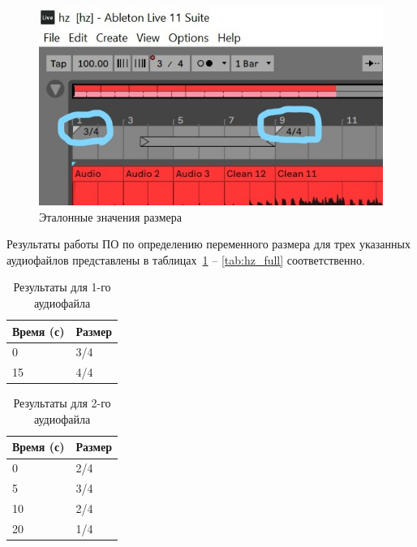 \begin{figure}[h]
	\centering
	\includegraphics[scale=0.7]{inc/img/hz_ref.jpg}
	\caption{Эталонные значения размера}
	\label{img:hz_ref}
\end{figure}


Результаты работы ПО по определению переменного размера для трех указанных аудиофайлов представлены в таблицах~\ref{tab:hz_drums} -- \ref{tab:hz_full} соответственно.

\begin{table}[!h]
	\begin{center}
		\caption{\label{tab:hz_drums}Результаты для 1-го аудиофайла}
		\begin{tabular}{|p{8cm}|p{8cm}|}
			\hline
			Время (с) & Размер\\
			\hline
			0 & 3/4\\
			\hline
			15 & 4/4\\
			\hline
		\end{tabular}
	\end{center}
\end{table}

\begin{table}[!h]
	\begin{center}
		\caption{\label{tab:hz_guitar}Результаты для 2-го аудиофайла}
		\begin{tabular}{|p{8cm}|p{8cm}|}
			\hline
			Время (с) & Размер\\
			\hline
			0 & 2/4\\
			\hline
			5 & 3/4\\
			\hline
			10 & 2/4\\
			\hline
			20 & 1/4\\
			\hline
		\end{tabular}
	\end{center}
\end{table}

